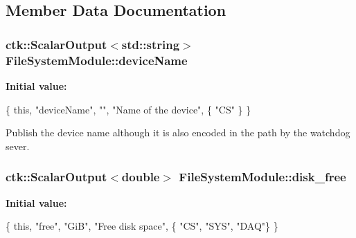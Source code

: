\subsection{Member Data Documentation}
\subsubsection[{\texorpdfstring{device\+Name}{deviceName}}]{\setlength{\rightskip}{0pt plus 5cm}ctk\+::\+Scalar\+Output$<$std\+::string$>$ File\+System\+Module\+::device\+Name}\hypertarget{structFileSystemModule_a1f0d9c5b8ee4bf06a7ea0d5cb0205eeb}{}\label{structFileSystemModule_a1f0d9c5b8ee4bf06a7ea0d5cb0205eeb}
{\bfseries Initial value\+:}
\begin{DoxyCode}
\{ \textcolor{keyword}{this}, \textcolor{stringliteral}{"deviceName"}, \textcolor{stringliteral}{""}, \textcolor{stringliteral}{"Name of the device"},
        \{ \textcolor{stringliteral}{"CS"} \} \}
\end{DoxyCode}
Publish the device name although it is also encoded in the path by the watchdog sever. 
\subsubsection[{\texorpdfstring{disk\+\_\+free}{disk_free}}]{\setlength{\rightskip}{0pt plus 5cm}ctk\+::\+Scalar\+Output$<$double$>$ File\+System\+Module\+::disk\+\_\+free}\hypertarget{structFileSystemModule_a11fea9c13f63fd00198a5c5ed4ca5f14}{}\label{structFileSystemModule_a11fea9c13f63fd00198a5c5ed4ca5f14}
{\bfseries Initial value\+:}
\begin{DoxyCode}
\{ \textcolor{keyword}{this}, \textcolor{stringliteral}{"free"}, \textcolor{stringliteral}{"GiB"}, \textcolor{stringliteral}{"Free disk space"},
          \{ \textcolor{stringliteral}{"CS"}, \textcolor{stringliteral}{"SYS"}, \textcolor{stringliteral}{"DAQ"}\} \}
\end{DoxyCode}
